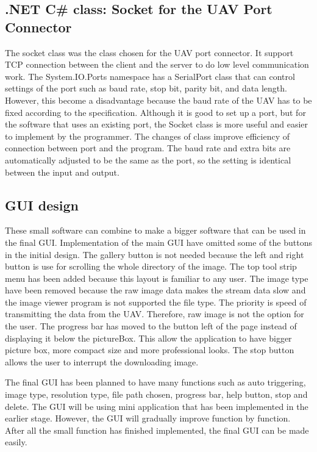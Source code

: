 \documentclass[oneside]{ecsgdp}         %
\begin{document}
\subsection{.NET C\# class: Socket for the UAV Port Connector}
The socket class was the class chosen for the UAV port connector. It support TCP connection between the client and the server to do low level communication work\cite{xiaX}. The System.IO.Ports namespace has a SerialPort class that can control settings of the port such as baud rate, stop bit, parity bit, and data length. However, this become a disadvantage because the baud rate of the UAV has to be fixed according to the specification. Although it is good to set up a port, but for the software that uses an existing port, the Socket class is more useful and easier to implement by the programmer. The changes of class improve efficiency of connection between port and the program. The baud rate and extra bits are automatically adjusted to be the same as the port, so the setting is identical between the input and output. 
\subsection{GUI design}
These small software can combine to make a bigger software that can be used in the final GUI.
Implementation of the main GUI have omitted some of the buttons in the initial design. The gallery button is not needed because the left and right button is use for scrolling the whole directory of the image. The top tool strip menu has been added because this layout is familiar to any user. The image type have been removed because the raw image data makes the stream data slow and the image viewer program is not supported the file type. The priority is speed of transmitting the data from the UAV. Therefore, raw image is not the option for the user. The progress bar has moved to the button left of the page instead of displaying it below the pictureBox. This allow the application to have bigger picture box, more compact size and more professional looks. The stop button allows the user to interrupt the downloading image.

The final GUI has been planned to have many functions such as auto triggering, image type, resolution type, file path chosen, progress bar, help button, stop and delete. The GUI will be using mini application that has been implemented in the earlier stage. However, the GUI will gradually improve function by function. After all the small function has finished implemented, the final GUI can be made easily.  
\end{document}
